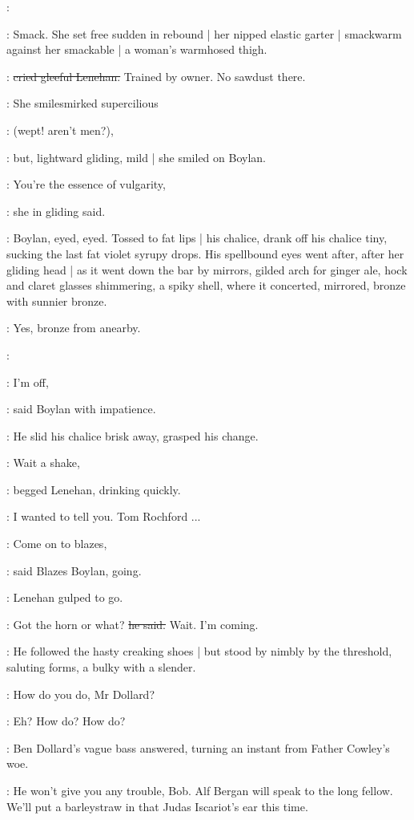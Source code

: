 \lenehan:

:
Smack.
She set free sudden in rebound |
her nipped elastic garter |
smackwarm against her smackable |
a woman's warmhosed thigh.

\lenehan:
\sout{cried gleeful Lenehan.}
Trained by owner.
No sawdust there.

:
She smilesmirked supercilious

\MissDInt:
(wept!
aren't men?),

:
but,
lightward gliding,
mild |
she smiled on Boylan.

\MissD:
You're the essence of vulgarity,

:
she in gliding said.

:
Boylan,
eyed,
eyed.
Tossed to fat lips |
his chalice,
drank off his chalice tiny,
sucking the last fat violet syrupy drops.
His spellbound eyes went after,
after her gliding head |
as it went down the bar by mirrors,
gilded arch for ginger ale,
hock and claret glasses shimmering,
a spiky shell,
where it concerted,
mirrored,
bronze with sunnier bronze.

:
Yes,
bronze from anearby.

\simon:

\boylan:
I'm off,

:
said Boylan with impatience.

:
He slid his chalice brisk away,
grasped his change.

\lenehan:
Wait a shake,

:
begged Lenehan,
drinking quickly.

\lenehan:
I wanted to tell you.
Tom Rochford ...

\boylan:
Come on to blazes,

:
said Blazes Boylan,
going.

:
Lenehan gulped to go.

\lenehan:
Got the horn or what?
\sout{he said.}
Wait.
I'm coming.

:
He followed the hasty creaking shoes |
but stood by nimbly by the threshold,
saluting forms,
a bulky with a slender.

\lenehan:
How do you do,
Mr Dollard?

\dollard:
Eh?
How do?
How do?

:
Ben Dollard's vague bass answered,
turning an instant from Father Cowley's woe.

\dollard:
He won't give you any trouble,
Bob.
Alf Bergan will speak to the long fellow.
We'll put a barleystraw in that Judas Iscariot's ear
this time.

